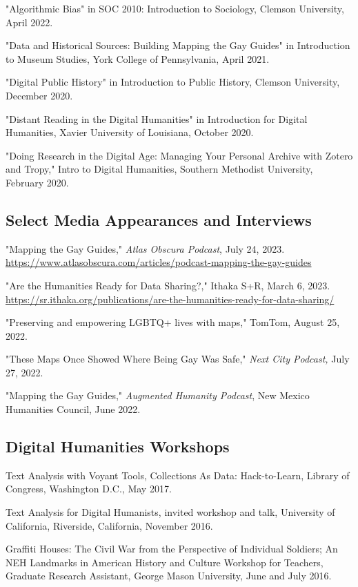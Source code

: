 \documentclass[11pt]{article}
\begin{document}
"Algorithmic Bias" in SOC 2010: Introduction to Sociology, Clemson University, April 2022.

"Data and Historical Sources: Building Mapping the Gay Guides" in Introduction to Museum Studies, York College of Pennsylvania, April 2021.

"Digital Public History" in Introduction to Public History, Clemson University, December 2020.

"Distant Reading in the Digital Humanities" in Introduction for Digital Humanities, Xavier University of Louisiana, October 2020.

"Doing Research in the Digital Age: Managing Your Personal Archive with Zotero and Tropy," Intro to Digital Humanities, Southern Methodist University, February 2020.

\subsection{Select Media Appearances and Interviews}
"Mapping the Gay Guides," \emph{Atlas Obscura Podcast}, July 24, 2023. \url{https://www.atlasobscura.com/articles/podcast-mapping-the-gay-guides}

"Are the Humanities Ready for Data Sharing?," Ithaka S+R, March 6, 2023. \url{https://sr.ithaka.org/publications/are-the-humanities-ready-for-data-sharing/}

"Preserving and empowering LGBTQ+ lives with maps," TomTom, August 25, 2022.

"These Maps Once Showed Where Being Gay Was Safe," \emph{Next City Podcast,} July 27, 2022.

"Mapping the Gay Guides," \emph{Augmented Humanity Podcast}, New Mexico Humanities Council, June 2022.

\subsection{Digital Humanities Workshops}
Text Analysis with Voyant Tools, Collections As Data: Hack-to-Learn, Library of Congress, Washington D.C., May 2017.

Text Analysis for Digital Humanists, invited workshop and talk, University of California, Riverside, California, November 2016.

Graffiti Houses: The Civil War from the Perspective of Individual Soldiers; An NEH Landmarks in American History and Culture Workshop for Teachers, Graduate Research Assistant, George Mason University, June and July 2016.
\end{document}
